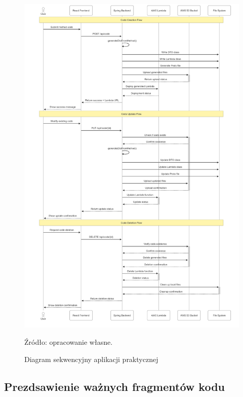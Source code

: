 \documentclass[runningheads,12pt]{llncs}
\begin{document}
\newpage

\begin{figure}[H] %
    \centering
    \includegraphics[width=\linewidth]{images/sequentinal-diagram.png}
    \caption{Diagram sekwencyjny aplikacji praktycznej}
    \label{fig2}
    \vspace{0.5em}
    {\small Źródło: opracowanie własne.}
\end{figure}

\newpage


\subsection{Prezdsawienie ważnych fragmentów kodu}
\end{document}
